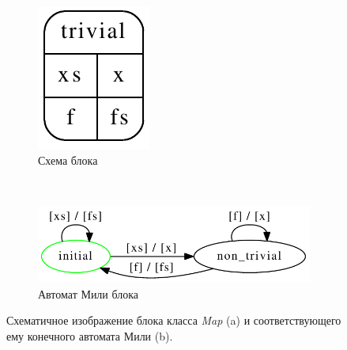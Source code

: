 \documentclass[10pt,a4paper]{article}
\begin{document}
\begin{figure}[H]
  \centering

  \begin{subfigure}[b]{0.2\textwidth}
    \centering
    \label{map:connection}
    \includegraphics[width=\textwidth]{map_cg.pdf}
    \caption{Схема блока}
  \end{subfigure}
  ~
  \begin{subfigure}[b]{0.7\textwidth}
    \centering
    \label{map:fa}
    \includegraphics[width=\textwidth]{map_fa.pdf}
    \caption{Автомат Мили блока}
  \end{subfigure}
  
  \label{map}
  \caption{Схематичное изображение блока класса \textit{Map} (a) и соответствующего ему конечного автомата Мили (b).}
\end{figure}
\end{document}
